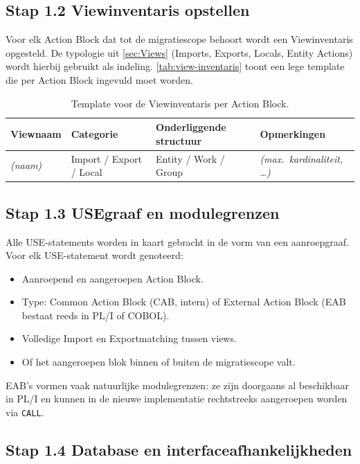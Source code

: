 \subsection{Stap 1.2 View\-inventaris opstellen}
\label{subsec:stap-views}

Voor elk Action Block dat tot de migratie\-scope behoort wordt een View\-inventaris opgesteld. De typologie 
uit \autoref{sec:Views} (Imports, Exports, Locals, Entity Actions) wordt hierbij gebruikt als 
indeling. \autoref{tab:view-inventaris} toont een lege template die per Action Block ingevuld moet worden.

\begin{table}[h]
\centering
\caption[View\-inventaris template]{Template voor de View\-inventaris per Action Block.}
\label{tab:view-inventaris}
\begin{tabular}{|l|l|l|l|}
\hline
\textbf{Viewnaam} & \textbf{Categorie} & \textbf{Onderliggende structuur} & \textbf{Opmerkingen} \\
\hline
\textit{(naam)} & Import / Export / Local & Entity / Work / Group & \textit{(max.\ kardinaliteit, \dots)} \\
\hline
\end{tabular}
\end{table}

\subsection{Stap 1.3 USE\-graaf en modulegrenzen}
\label{subsec:stap-usegraaf}

Alle USE-statements worden in kaart gebracht in de vorm van een aanroepgraaf. Voor elk USE-statement wordt 
genoteerd:
\begin{itemize}
    \item Aanroepend en aangeroepen Action Block.
    \item Type: Common Action Block (CAB, intern) of External Action Block (EAB bestaat reeds in 
    PL/I of COBOL).
    \item Volledige Import\- en Export\-matching tussen views.
    \item Of het aangeroepen blok binnen of buiten de migratiescope valt.
\end{itemize}
EAB's vormen vaak natuurlijke modulegrenzen: ze zijn doorgaans al beschikbaar in PL/I en kunnen in de nieuwe 
implementatie rechtstreeks aangeroepen worden via \texttt{CALL}.

\subsection{Stap 1.4 Database\- en interface\-afhankelijkheden}
\label{subsec:stap-db}


